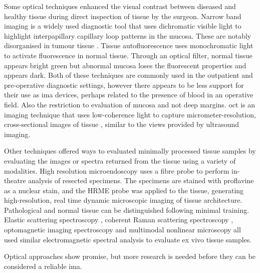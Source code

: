 Some optical techniques enhanced the visual contrast between diseased and healthy tissue during direct inspection of tissue by the surgeon. 
Narrow band imaging \cite{tirelliNarrowBandImaging2015, tirellig.TailoredResectionsOral2018} is a widely used diagnostic tool that uses dichromatic visible light to highlight interpapillary capillary loop patterns in the mucosa. 
These are notably disorganised in tumour tissue \cite{vuEfficacyNarrowBand2014}.
Tissue autofluorescence \cite{ohnishiy.UsefulnessFluorescenceVisualization2016} uses monochromatic light to activate fluorescence in normal tissue.
Through an optical filter, normal tissue appears bright green but abnormal mucosa loses the fluorescent properties and appears dark.
Both of these techniques are commonly used in the outpatient and pre-operative diagnostic settings, however there appears to be less support for their use as \gls{ima} devices, perhaps related to the presence of blood in an operative field. 
Also the restriction to evaluation of mucosa and not deep margins.
\Gls{oct} is an imaging technique that uses low-coherence light to capture micrometer-resolution, cross-sectional images of tissue \cite{hamdoonz.OpticalCoherenceTomography2016, heidaria.e.UseOpticalCoherence2020}, similar to the views provided by ultrasound imaging.

Other techniques offered ways to evaluated minimally processed tissue samples by evaluating the images or spectra returned from the tissue using a variety of modalities.
High resolution microendoscopy \cite{vilap.m.DiscriminationBenignNeoplastic2012, milesb.a.OperativeMarginControl2015} uses a fibre probe to perform in-theatre analysis of resected specimens.
The specimens are stained with proflavine as a nuclear stain, and the HRME probe was applied to the tissue, generating high-resolution, real time dynamic microscopic imaging of tissue architecture.
Pathological and normal tissue can be distinguished following minimal training.
Elastic scattering spectroscopy \cite{grilloneg.a.ColorCancerMargin2017}, coherent Raman scattering spectroscopy \cite{hoeslir.c.CoherentRamanScattering2017}, optomagnetic imaging spectroscopy \cite{lisulb.PredictiveValueOptomagnetic2019} and multimodal nonlinear microscopy \cite{heukes.MultimodalNonlinearMicroscopy2016} all used similar electromagnetic spectral analysis to evaluate ex vivo tissue samples.

Optical approaches show promise, but more research is needed before they can be considered a reliable \gls{ima}.


